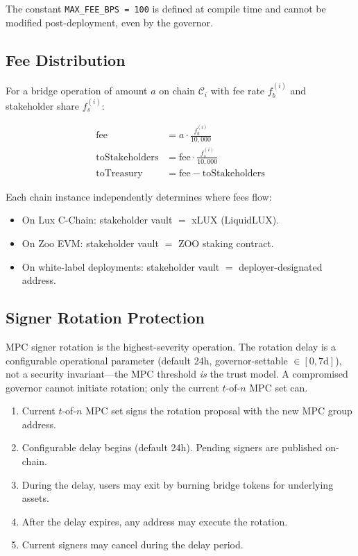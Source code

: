 \documentclass[11pt,twocolumn]{article}
\theoremstyle{definition}
\newcommand{\Chain}{\mathcal{C}}
\begin{document}
\noindent
The constant \texttt{MAX\_FEE\_BPS = 100} is defined at compile time and cannot be modified post-deployment, even by the governor.

\subsection{Fee Distribution}

For a bridge operation of amount $a$ on chain $\Chain_i$ with fee rate $f_b^{(i)}$ and stakeholder share $f_s^{(i)}$:

\begin{align}
  \text{fee} &= a \cdot \frac{f_b^{(i)}}{10{,}000} \\
  \text{toStakeholders} &= \text{fee} \cdot \frac{f_s^{(i)}}{10{,}000} \\
  \text{toTreasury} &= \text{fee} - \text{toStakeholders}
\end{align}

Each chain instance independently determines where fees flow:
\begin{itemize}[nosep]
  \item On Lux C-Chain: stakeholder vault $=$ xLUX (LiquidLUX).
  \item On Zoo EVM: stakeholder vault $=$ ZOO staking contract.
  \item On white-label deployments: stakeholder vault $=$ deployer-designated address.
\end{itemize}

\subsection{Signer Rotation Protection}

MPC signer rotation is the highest-severity operation. The rotation delay is a configurable operational parameter (default 24h, governor-settable $\in [0, 7\text{d}]$), not a security invariant---the MPC threshold \emph{is} the trust model. A compromised governor cannot initiate rotation; only the current $t$-of-$n$ MPC set can.

\begin{enumerate}[nosep]
  \item Current $t$-of-$n$ MPC set signs the rotation proposal with the new MPC group address.
  \item Configurable delay begins (default 24h). Pending signers are published on-chain.
  \item During the delay, users may exit by burning bridge tokens for underlying assets.
  \item After the delay expires, any address may execute the rotation.
  \item Current signers may cancel during the delay period.
\end{enumerate}
\end{document}
